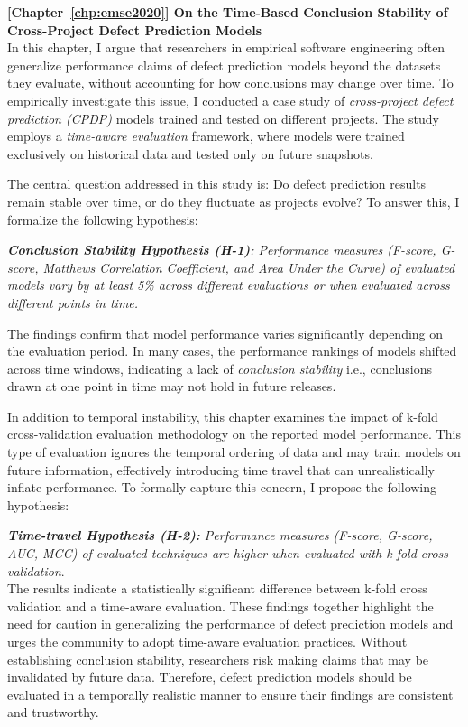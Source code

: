 \documentclass[\main/thesis.tex]{subfiles}
\begin{document}
\textbf{[Chapter~\ref{chp:emse2020}] On the Time-Based Conclusion Stability of Cross-Project Defect Prediction Models}\\
In this chapter, I argue that researchers in empirical software engineering often generalize performance claims of defect prediction models beyond the datasets they evaluate, without accounting for how conclusions may change over time. To empirically investigate this issue, I conducted a case study of \textit{cross-project defect prediction (CPDP)} models trained and tested on different projects. The study employs a \textit{time-aware evaluation} framework, where models were trained exclusively on historical data and tested only on future snapshots.

The central question addressed in this study is: Do defect prediction results remain stable over time, or do they fluctuate as projects evolve? To answer this, I formalize the following hypothesis:


\textit{\textbf{Conclusion Stability Hypothesis (H-1)}: Performance measures (F-score, G-score, Matthews Correlation Coefficient, and Area Under the Curve) of evaluated models vary by at least 5\% across different evaluations or when evaluated across different points in time.}


The findings confirm that model performance varies significantly depending on the evaluation period. In many cases, the performance rankings of models shifted across time windows, indicating a lack of \textit{conclusion stability} i.e., conclusions drawn at one point in time may not hold in future releases.


In addition to temporal instability, this chapter examines the impact of k-fold cross-validation evaluation methodology on the reported model performance. This type of evaluation ignores the temporal ordering of data and may train models on future information, effectively introducing time travel that can unrealistically inflate performance. To formally capture this concern, I propose the following hypothesis:

\textit{\textbf{Time-travel Hypothesis (H-2):} Performance measures (F-score, G-score, AUC, MCC) of evaluated techniques are higher when evaluated with k-fold cross-validation}.\\

The results indicate a statistically significant difference between k-fold cross validation and a time-aware evaluation.
These findings together highlight the need for caution in generalizing the performance of defect prediction models and urges the community to adopt time-aware evaluation practices. Without establishing conclusion stability, researchers risk making claims that may be invalidated by future data. Therefore, defect prediction models should be evaluated in a temporally realistic manner to ensure their findings are consistent and trustworthy.
\end{document}
